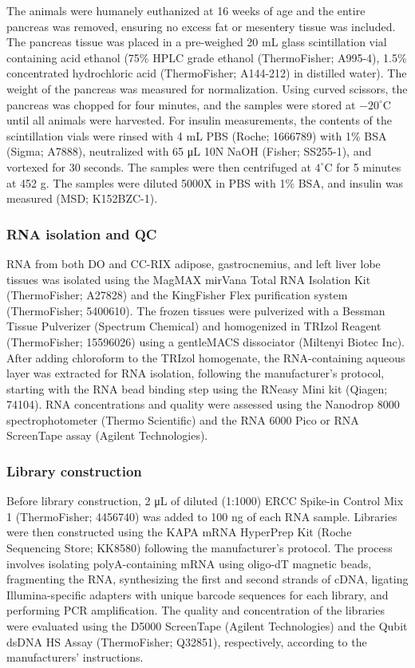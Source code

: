 \documentclass[
]{article}
\begin{document}
The animals were humanely euthanized at 16 weeks of age and the entire
pancreas was removed, ensuring no excess fat or mesentery tissue was
included. The pancreas tissue was placed in a pre-weighed 20 mL glass
scintillation vial containing acid ethanol (75\% HPLC grade ethanol
(ThermoFisher; A995-4), 1.5\% concentrated hydrochloric acid
(ThermoFisher; A144-212) in distilled water). The weight of the pancreas
was measured for normalization. Using curved scissors, the pancreas was
chopped for four minutes, and the samples were stored at
\(-20^{\circ}\)C until all animals were harvested. For insulin
measurements, the contents of the scintillation vials were rinsed with 4
mL PBS (Roche; 1666789) with 1\% BSA (Sigma; A7888), neutralized with 65
\si{\micro\liter} 10N NaOH (Fisher; SS255-1), and vortexed for 30
seconds. The samples were then centrifuged at \(4^{\circ}\)C for 5
minutes at 452 g. The samples were diluted 5000X in PBS with 1\% BSA,
and insulin was measured (MSD; K152BZC-1).

\subsubsection{RNA isolation and QC}\label{rna-isolation-and-qc}

RNA from both DO and CC-RIX adipose, gastrocnemius, and left liver lobe
tissues was isolated using the MagMAX mirVana Total RNA Isolation Kit
(ThermoFisher; A27828) and the KingFisher Flex purification system
(ThermoFisher; 5400610). The frozen tissues were pulverized with a
Bessman Tissue Pulverizer (Spectrum Chemical) and homogenized in
TRIzol\textsuperscript{\texttrademark} Reagent (ThermoFisher; 15596026)
using a gentleMACS dissociator (Miltenyi Biotec Inc). After adding
chloroform to the TRIzol homogenate, the RNA-containing aqueous layer
was extracted for RNA isolation, following the manufacturer's protocol,
starting with the RNA bead binding step using the RNeasy Mini kit
(Qiagen; 74104). RNA concentrations and quality were assessed using the
Nanodrop 8000 spectrophotometer (Thermo Scientific) and the RNA 6000
Pico or RNA ScreenTape assay (Agilent Technologies).

\subsubsection{Library construction}\label{library-construction}

Before library construction, 2 \si{\micro\liter} of diluted (1:1000)
ERCC Spike-in Control Mix 1 (ThermoFisher; 4456740) was added to 100 ng
of each RNA sample. Libraries were then constructed using the KAPA mRNA
HyperPrep Kit (Roche Sequencing Store; KK8580) following the
manufacturer's protocol. The process involves isolating polyA-containing
mRNA using oligo-dT magnetic beads, fragmenting the RNA, synthesizing
the first and second strands of cDNA, ligating Illumina-specific
adapters with unique barcode sequences for each library, and performing
PCR amplification. The quality and concentration of the libraries were
evaluated using the D5000 ScreenTape (Agilent Technologies) and the
Qubit dsDNA HS Assay (ThermoFisher; Q32851), respectively, according to
the manufacturers' instructions.
\end{document}

